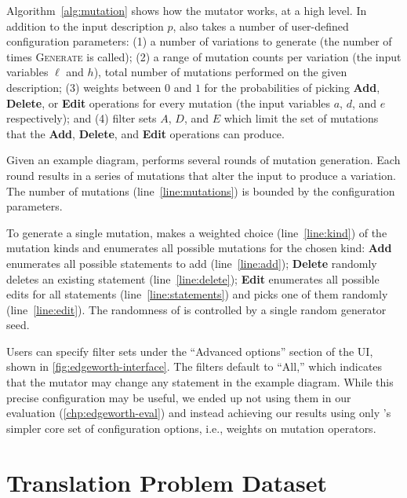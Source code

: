 Algorithm~\ref{alg:mutation} shows how the \Edgeworth mutator works, at a high level. In addition to the input \Substance description $p$, \Edgeworth also takes a number of user-defined configuration parameters: (1) a number of variations to generate (the number of times \textsc{Generate} is called); (2) a range of mutation counts per variation (the input variables $\ell$ and $h$), \ie total number of mutations performed on the given \Substance description; (3) weights between $0$ and $1$ for the probabilities of picking \textbf{Add}, \textbf{Delete}, or \textbf{Edit} operations for every mutation (the input variables $a$, $d$, and $e$ respectively); and (4) filter sets $A$, $D$, and $E$ which limit the set of mutations that the \textbf{Add}, \textbf{Delete}, and \textbf{Edit} operations can produce.

Given an example diagram, \Edgeworth performs several rounds of mutation generation. Each round results in a series of mutations that alter the input to produce a variation. The number of mutations (line~\ref{line:mutations}) is bounded by the configuration parameters.

To generate a single mutation, \Edgeworth makes a weighted choice (line~\ref{line:kind}) of the mutation kinds and enumerates all possible mutations for the chosen kind: \textbf{Add} enumerates all possible statements to add (line~\ref{line:add}); \textbf{Delete} randomly deletes an existing statement (line~\ref{line:delete}); \textbf{Edit} enumerates all possible edits for all statements (line~\ref{line:statements}) and picks one of them randomly (line~\ref{line:edit}). The randomness of \Edgeworth is controlled by a single random generator seed.

Users can specify filter sets under the ``Advanced options'' section of the UI, shown in \cref{fig:edgeworth-interface}. The filters default to ``All,'' which indicates that the mutator may change any statement in the example diagram. While this precise configuration may be useful, we ended up not using them in our evaluation (\cref{chp:edgeworth-eval}) and instead achieving our results using only \Edgeworth's simpler core set of configuration options, i.e., weights on mutation operators.



\section{Translation Problem Dataset}
\label{sec:edgeworth-case-studies}

